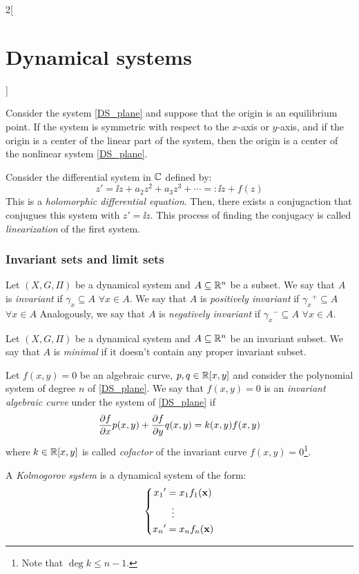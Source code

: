 \documentclass[../../../main.tex]{subfiles}
\begin{document}
\begin{multicols}{2}[\section{Dynamical systems}]
  \begin{theorem}
    Consider the system \cref{DS_plane} and suppose that the origin is an equilibrium point. If the system is symmetric with respect to the $x$-axis or $y$-axis, and if the origin is a center of the linear part of the system, then the origin is a center of the nonlinear system \cref{DS_plane}.
  \end{theorem}
  \begin{theorem}
    Consider the differential system in $\mathbb{C}$ defined by:
    $$z'=\ii z+ a_2z^2+a_3z^3+\cdots=:\ii z+f(z)$$ This is a \emph{holomorphic differential equation}. Then, there exists a conjugaction that conjugues this system with $z'=\ii z$. This process of finding the conjugacy is called \emph{linearization} of the first system.
  \end{theorem}
  \subsubsection{Invariant sets and limit sets}
  \begin{definition}
    Let $(X,G,\Pi)$ be a dynamical system and $A\subseteq \mathbb{R}^n$ be a subset. We say that $A$ is \emph{invariant} if $\gamma_x\subseteq A$ $\forall x\in A$. We say that $A$ is \emph{positively invariant} if ${\gamma_x}^+\subseteq A$ $\forall x\in A$ Analogously, we say that $A$ is \emph{negatively invariant} if ${\gamma_x}^-\subseteq A$ $\forall x\in A$.
  \end{definition}
  \begin{definition}
    Let $(X,G,\Pi)$ be a dynamical system and $A\subseteq \mathbb{R}^n$ be an invariant subset. We say that $A$ is \emph{minimal} if it doesn't contain any proper invariant subset.
  \end{definition}
  \begin{definition}
    Let $f(x,y)=0$ be an algebraic curve, $p,q\in\mathbb{R}[x,y]$ and consider the polynomial system of degree $n$ of \cref{DS_plane}. We say that $f(x,y)=0$ is an \emph{invariant algebraic curve} under the system of \cref{DS_plane} if
    \begin{equation}
      \pdv{f}{x}(x,y)p(x,y)+\pdv{f}{y}q(x,y)=k(x,y)f(x,y)
    \end{equation}
    where $k\in\mathbb{R}[x,y]$ is called \emph{cofactor} of the invariant curve $f(x,y)=0$\footnote{Note that $\deg k\leq n-1$.}.
  \end{definition}
  \begin{definition}
    A \emph{Kolmogorov system} is a dynamical system of the form:
    \begin{equation}
      \left\{
      \begin{aligned}
        {x_1}' & =x_1 f_1(\boldsymbol{\mathrm{x}}) \\
               & \;\;\vdots       \\
        {x_n}' & =x_n f_n(\boldsymbol{\mathrm{x}})
      \end{aligned}
      \right.
    \end{equation}
  \end{definition}

\end{multicols}
\end{document}
